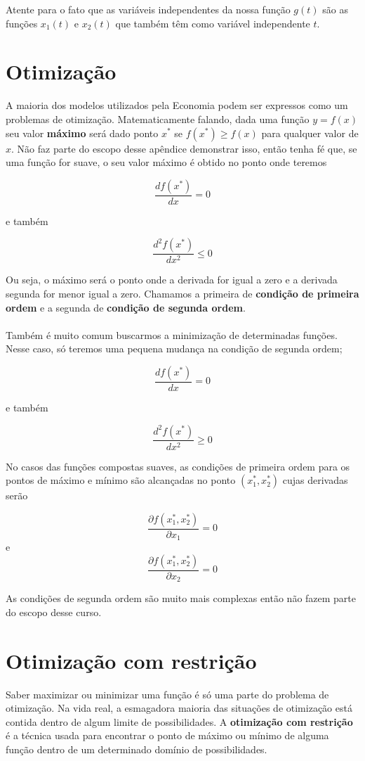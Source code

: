 \documentclass[a4paper,11pt,oneside]{book}
\theoremstyle{definition}
\theoremstyle{break}
\begin{document}
Atente para o fato que as variáveis independentes da nossa função $g(t)$ são as funções $x_1(t)$ e $x_2(t)$ que também têm como variável independente $t$.

\section*{Otimização}

A maioria dos modelos utilizados pela Economia podem ser expressos como um problemas de otimização. Matematicamente falando, dada uma função $y = f(x)$ seu valor \textbf{máximo} será dado ponto $x^*$ se $f(x^*) \geqslant f(x)$ para qualquer valor de $x$. Não faz parte do escopo desse apêndice demonstrar isso, então tenha fé que, se uma função for suave, o seu valor máximo é obtido no ponto onde teremos

$$ \frac{df(x^*)}{dx} = 0 $$

e também

$$ \frac{d^2f(x^*)}{dx^2} \leq 0$$

Ou seja, o máximo será o ponto onde a derivada for igual a zero e a derivada segunda for menor igual a zero. Chamamos a primeira de \textbf{condição de primeira ordem} e a segunda de \textbf{condição de segunda ordem}.
\\~\\
Também é muito comum buscarmos a minimização de determinadas funções. Nesse caso, só teremos uma pequena mudança na condição de segunda ordem;

$$ \frac{df(x^*)}{dx} = 0 $$

e também

$$ \frac{d^2f(x^*)}{dx^2} \geq 0$$

No casos das funções compostas suaves, as condições de primeira ordem para os pontos de máximo e mínimo são alcançadas no ponto $(x_{1}^*,x_{2}^*)$ cujas derivadas serão

$$ \frac{\partial f(x_{1}^*,x_{2}^*)}{\partial x_1} = 0 $$
e
$$ \frac{\partial f(x_{1}^*,x_{2}^*)}{\partial x_2} = 0 $$

As condições de segunda ordem são muito mais complexas então não fazem parte do escopo desse curso.

\section*{Otimização com restrição}

Saber maximizar ou minimizar uma função é só uma parte do problema de otimização. Na vida real, a esmagadora maioria das situações de otimização está contida dentro de algum limite de possibilidades. A \textbf{otimização com restrição} é a técnica usada para encontrar o ponto de máximo ou mínimo de alguma função dentro de um determinado domínio de possibilidades.
\end{document}
